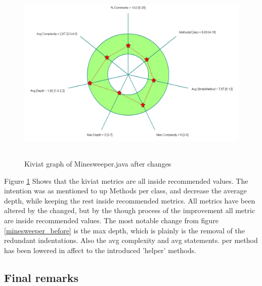\documentclass[UKenglish]{article}  %
\begin{document}
\begin{figure}
	\caption{Kiviat graph of Minesweeper.java after changes}
	\includegraphics[height=8cm]{kiviat_minesweeper_after}
	\label{minesweeper_after}
\end{figure}

Figure \ref{minesweeper_after} Shows that the kiviat metrics are all inside 
recommended values. The intention was as mentioned to up Methods per class, and decrease
the average depth, while keeping the rest inside recommended metrics. All
metrics have been altered by the changed, but by the though process of the
improvement all metric are inside recommended values. The most notable change
from figure \ref{minesweeper_before} is the max depth, which is plainly is the
removal of the redundant indentations. Also the avg complexity and avg 
statements.
per method has been lowered in affect to the introduced 'helper' methods. 

\subsection{Final remarks}
\end{document}
